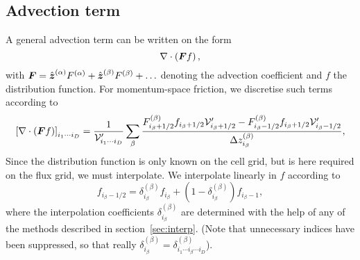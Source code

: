 \documentclass{notes}
\newcommand{\Vp}{\mathcal{V}'}
\begin{document}
    \subsection{Advection term}
    A general advection term can be written on the form
    \begin{equation*}
        \nabla\cdot\left( \boldsymbol{F} f \right),
    \end{equation*}
    with $\boldsymbol{F} = \hat{\boldsymbol{z}}^{(\alpha)}F^{(\alpha)} + \hat{\boldsymbol{z}}^{(\beta)}F^{(\beta)}+\ldots$
    denoting the advection coefficient and $f$ the distribution function. For
    momentum-space friction, we discretise such terms according to
    \begin{equation}\label{eq:advection:discr}
        \left[\nabla\cdot\left( \bb{F}f \right) \right]_{i_1\cdots i_D} =
            \frac{1}{\Vp_{i_1\cdots i_D}}\sum_\beta \frac{
                F^{(\beta)}_{i_\beta+1/2}f_{i_\beta+1/2} \Vp_{i_\beta+1/2} -
                F^{(\beta)}_{i_\beta-1/2}f_{i_\beta+1/2} \Vp_{i_\beta-1/2}
            }{\Delta z^{(\beta)}_{i_\beta}},
    \end{equation}
    Since the distribution function is only known on the cell grid, but is here
    required on the flux grid, we must interpolate. We interpolate linearly in
    $f$ according to
    \begin{equation}
        f_{i_\beta-1/2} = \delta^{(\beta)}_{i_\beta} f_{i_\beta} + \left( 1 - \delta^{(\beta)}_{i_\beta} \right) f_{i_\beta-1},
    \end{equation}
    where the interpolation coefficients $\delta^{(\beta)}_{i_\beta}$ are
    determined with the help of any of the methods described in
    section~\ref{sec:interp}. (Note that unnecessary indices have been
    suppressed, so that really
    $\delta^{(\beta)}_{i_\beta} = \delta^{(\beta)}_{i_1\cdots i_\beta\cdots i_D}$).
\end{document}
